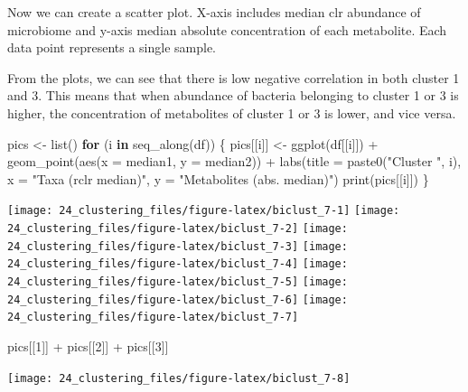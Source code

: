 \documentclass[
]{book}
\newenvironment{Shaded}{\begin{snugshade}}{\end{snugshade}}
\newcommand{\AttributeTok}[1]{\textcolor[rgb]{0.77,0.63,0.00}{#1}}
\newcommand{\ControlFlowTok}[1]{\textcolor[rgb]{0.13,0.29,0.53}{\textbf{#1}}}
\newcommand{\DecValTok}[1]{\textcolor[rgb]{0.00,0.00,0.81}{#1}}
\newcommand{\FunctionTok}[1]{\textcolor[rgb]{0.00,0.00,0.00}{#1}}
\newcommand{\NormalTok}[1]{#1}
\newcommand{\OtherTok}[1]{\textcolor[rgb]{0.56,0.35,0.01}{#1}}
\newcommand{\SpecialCharTok}[1]{\textcolor[rgb]{0.00,0.00,0.00}{#1}}
\newcommand{\StringTok}[1]{\textcolor[rgb]{0.31,0.60,0.02}{#1}}
\begin{document}
Now we can create a scatter plot. X-axis includes median clr abundance
of microbiome and y-axis median absolute concentration of each
metabolite. Each data point represents a single sample.

From the plots, we can see that there is low negative correlation in
both cluster 1 and 3. This means that when abundance of bacteria
belonging to cluster 1 or 3 is higher, the concentration of
metabolites of cluster 1 or 3 is lower, and vice versa.

\begin{Shaded}
\begin{Highlighting}[]
\NormalTok{pics }\OtherTok{\textless{}{-}} \FunctionTok{list}\NormalTok{()}
\ControlFlowTok{for}\NormalTok{ (i }\ControlFlowTok{in} \FunctionTok{seq\_along}\NormalTok{(df)) \{}
\NormalTok{    pics[[i]] }\OtherTok{\textless{}{-}} \FunctionTok{ggplot}\NormalTok{(df[[i]]) }\SpecialCharTok{+}
        \FunctionTok{geom\_point}\NormalTok{(}\FunctionTok{aes}\NormalTok{(}\AttributeTok{x =}\NormalTok{ median1, }\AttributeTok{y =}\NormalTok{ median2)) }\SpecialCharTok{+}
        \FunctionTok{labs}\NormalTok{(}\AttributeTok{title =} \FunctionTok{paste0}\NormalTok{(}\StringTok{"Cluster "}\NormalTok{, i), }\AttributeTok{x =} \StringTok{"Taxa (rclr median)"}\NormalTok{,}
             \AttributeTok{y =} \StringTok{"Metabolites (abs. median)"}\NormalTok{)}
    \FunctionTok{print}\NormalTok{(pics[[i]])}
\NormalTok{\}}
\end{Highlighting}
\end{Shaded}

\texttt{[image: 24\_clustering\_files/figure-latex/biclust\_7-1]}
\texttt{[image: 24\_clustering\_files/figure-latex/biclust\_7-2]}
\texttt{[image: 24\_clustering\_files/figure-latex/biclust\_7-3]}
\texttt{[image: 24\_clustering\_files/figure-latex/biclust\_7-4]}
\texttt{[image: 24\_clustering\_files/figure-latex/biclust\_7-5]}
\texttt{[image: 24\_clustering\_files/figure-latex/biclust\_7-6]}
\texttt{[image: 24\_clustering\_files/figure-latex/biclust\_7-7]}

\begin{Shaded}
\begin{Highlighting}[]
\NormalTok{pics[[}\DecValTok{1}\NormalTok{]] }\SpecialCharTok{+}\NormalTok{ pics[[}\DecValTok{2}\NormalTok{]] }\SpecialCharTok{+}\NormalTok{ pics[[}\DecValTok{3}\NormalTok{]]}
\end{Highlighting}
\end{Shaded}

\texttt{[image: 24\_clustering\_files/figure-latex/biclust\_7-8]}
\end{document}
